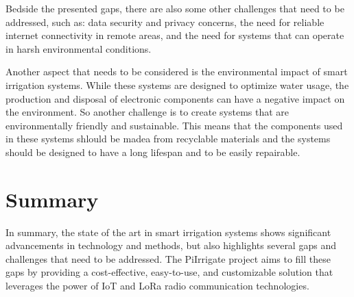 Bedside the presented gaps, there are also some other challenges that need to be addressed, such as:
data security and privacy concerns, the need for reliable internet connectivity in remote areas, 
and the need for systems that can operate in harsh environmental conditions. 

Another aspect that needs to be considered is the environmental impact of smart irrigation systems.
While these systems are designed to optimize water usage,
the production and disposal of electronic components can have a negative impact on the environment.
So another challenge is to create systems that are environmentally friendly and sustainable. This means 
that the components used in these systems shlould be madea from recyclable materials 
and the systems should be designed to have a long lifespan and to be easily repairable.

\section{Summary}
In summary, the state of the art in smart irrigation systems shows significant 
advancements in technology and methods, but also highlights several gaps and challenges 
that need to be addressed. The PiIrrigate project aims to fill these gaps by providing a
cost-effective, easy-to-use, and customizable solution that leverages the power of IoT and LoRa 
radio communication technologies.


